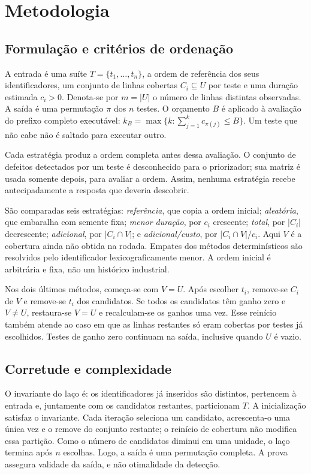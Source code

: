 \documentclass[12pt]{article}
\begin{document}
\section{Metodologia}
\subsection{Formulação e critérios de ordenação}
A entrada é uma suíte $T=\{t_1,\ldots,t_n\}$, a ordem de referência dos seus identificadores, um conjunto de linhas cobertas $C_i\subseteq U$ por teste e uma duração estimada $c_i>0$. Denota-se por $m=|U|$ o número de linhas distintas observadas. A saída é uma permutação $\pi$ dos $n$ testes. O orçamento $B$ é aplicado à avaliação do prefixo completo executável: $k_B=\max\{k:\sum_{j=1}^k c_{\pi(j)}\leq B\}$. Um teste que não cabe não é saltado para executar outro.

Cada estratégia produz a ordem completa antes dessa avaliação. O conjunto de defeitos detectados por um teste é desconhecido para o priorizador; sua matriz é usada somente depois, para avaliar a ordem. Assim, nenhuma estratégia recebe antecipadamente a resposta que deveria descobrir.

São comparadas seis estratégias: \emph{referência}, que copia a ordem inicial; \emph{aleatória}, que embaralha com semente fixa; \emph{menor duração}, por $c_i$ crescente; \emph{total}, por $|C_i|$ decrescente; \emph{adicional}, por $|C_i\cap V|$; e \emph{adicional/custo}, por $|C_i\cap V|/c_i$. Aqui $V$ é a cobertura ainda não obtida na rodada. Empates dos métodos determinísticos são resolvidos pelo identificador lexicograficamente menor. A ordem inicial é arbitrária e fixa, não um histórico industrial.

Nos dois últimos métodos, começa-se com $V=U$. Após escolher $t_i$, remove-se $C_i$ de $V$ e remove-se $t_i$ dos candidatos. Se todos os candidatos têm ganho zero e $V\neq U$, restaura-se $V=U$ e recalculam-se os ganhos uma vez. Esse reinício também atende ao caso em que as linhas restantes só eram cobertas por testes já escolhidos. Testes de ganho zero continuam na saída, inclusive quando $U$ é vazio.

\subsection{Corretude e complexidade}
O invariante do laço é: os identificadores já inseridos são distintos, pertencem à entrada e, juntamente com os candidatos restantes, particionam $T$. A inicialização satisfaz o invariante. Cada iteração seleciona um candidato, acrescenta-o uma única vez e o remove do conjunto restante; o reinício de cobertura não modifica essa partição. Como o número de candidatos diminui em uma unidade, o laço termina após $n$ escolhas. Logo, a saída é uma permutação completa. A prova assegura validade da saída, e não otimalidade da detecção.
\end{document}
